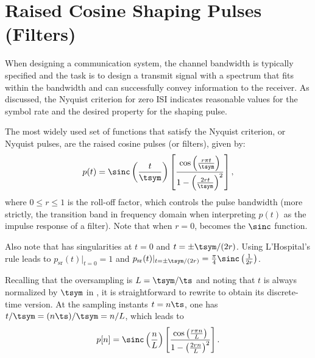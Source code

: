 
\section{Raised Cosine Shaping Pulses (Filters)}
\label{sec:raised_cosines}

When designing a communication system, the channel bandwidth is typically specified and the task is to design a transmit signal with a spectrum that fits within the bandwidth and can successfully convey information to the receiver. As discussed, the Nyquist criterion for zero ISI indicates reasonable values for the symbol rate and the desired property for the shaping pulse.

The most widely used set of functions that satisfy the Nyquist criterion, or Nyquist pulses, are the raised cosine pulses (or filters), given by:
\begin{equation}
p(t) = \sinc \left( \frac{t}{\tsym} \right) \left[ \frac{\cos \left( \frac{r \pi t}{\tsym} \right) }{1 - \left( \frac{2 r t}{\tsym} \right)^2} \right],
\label{eq:raisedCosine}
\end{equation}
where $0 \le r \le 1$ is the roll-off factor, which controls the pulse bandwidth (more strictly, the transition band in frequency domain when interpreting $p(t)$ as the impulse response of a filter). Note that when $r=0$,  becomes the $\sinc$ function.

Also note that 
has singularities at $t=0$ and $t=\pm \tsym / (2r)$. Using L'Hospital's rule leads to
$
p_{\textrm{sr}}(t)|_{t=0} = 1
$
and
$
p_{\textrm{sr}}(t)|_{t=\pm \tsym / (2r)} = \frac{\pi}{4} \sinc \left( \frac{1}{2r } \right)
$.

Recalling that the oversampling is $L=\tsym/\ts$ and noting that $t$ is always normalized by $\tsym$ in , it is straightforward to rewrite  to obtain its discrete-time version. At the sampling instants $t=n \ts$, one has $t / \tsym = (n \ts) / \tsym = n / L$, which leads to
\begin{equation}
p[n] = \sinc \left( \frac{n}{L} \right) \left[ \frac{\cos \left( \frac{r \pi n}{L} \right) }{1 - \left( \frac{2 r n}{L} \right)^2} \right].
\label{eq:raisedCosineDiscreteTime}
\end{equation}

